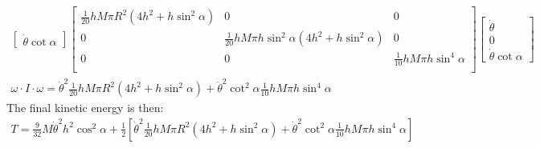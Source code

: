 \documentclass[10pt]{article}
\begin{document}
\begin{enumerate}
\begin{gather*}
\begin{bmatrix}
                \dot{\theta}\cot\alpha
            \end{bmatrix}
            \begin{bmatrix}
                \frac{1}{20} h M \pi  R^2 \left(4 h^2+h\sin^2\alpha\right) & 0                                                                  & 0                                 \\
                0                                                        & \frac{1}{20} h M \pi  h\sin^2\alpha \left(4 h^2+h\sin^2\alpha\right) & 0                                 \\
                0                                                        & 0                                                                  & \frac{1}{10} h M \pi  h\sin^4\alpha \\
            \end{bmatrix}
            \begin{bmatrix}
                \dot{\theta} \\
                0            \\
                \dot{\theta}\cot\alpha
            \end{bmatrix}\\
            \omega\cdot I\cdot\omega=\dot{\theta}^2 \frac{1}{20} h M \pi  R^2 \left(4 h^2+h\sin^2\alpha\right)+\dot{\theta}^2\cot^2\alpha\frac{1}{10} h M \pi  h\sin^4\alpha
        \end{gather*}
        The final kinetic energy is then:
        \begin{gather*}
            T=\frac{9}{32}M\dot{\theta}^2 h^2\cos^2\alpha+\frac{1}{2}\left[\dot{\theta}^2 \frac{1}{20} h M \pi  R^2 \left(4 h^2+h\sin^2\alpha\right)+\dot{\theta}^2\cot^2\alpha\frac{1}{10} h M \pi  h\sin^4\alpha\right]
        \end{gather*}
    \end{enumerate}
\end{document}
